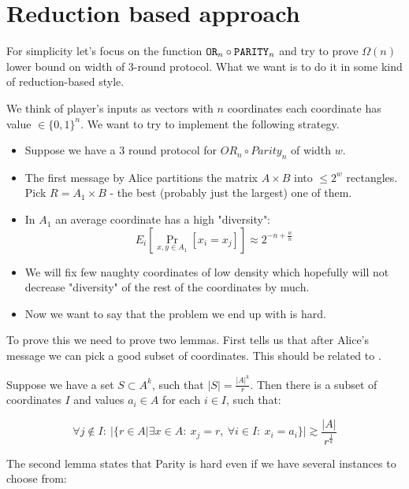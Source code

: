 \section{Reduction based approach}

For simplicity let's focus on the function $\mathtt{OR}_n \circ \mathtt{PARITY}_n$ and try to prove $\Omega(n)$ lower bound
on width of $3$-round protocol. What we want is to do it in some kind of reduction-based style. 

We think of player's inputs as vectors with $n$ coordinates each coordinate has value $\in \{0,
1\}^n$. We want to try to implement the following strategy.

\begin{itemize}
    \item Suppose we have a $3$ round protocol for $OR_n \circ Parity_n$ of width $w$.
    \item The first message by Alice partitions the matrix $A \times B$ into $\leq 2^w$ rectangles. Pick
        $R = A_1 \times B$ - the best (probably just the largest) one of them.
    \item In $A_1$ an average coordinate has a high "diversity":
        \[ E_i [\Pr\limits_{x, y \in A_1}[x_i = x_j]] \approx 2^{-n + \frac{w}{n}} \]
    \item We will fix few naughty coordinates of low density which hopefully will not decrease
        "diversity" of the rest of the coordinates by much.
    \item Now we want to say that the problem we end up with is hard.
\end{itemize}

To prove this we need to prove two lemmas. First tells us that after Alice's message we can pick a good
subset of coordinates. This should be related to \cite{meir2017prediction}.


\begin{lemma}
    Suppose we have a set $S \subset A^k$, such that $|S| = \frac{|A|^k}{r}$. Then there is a subset of
    coordinates $I$ and values $a_i \in A$ for each $i \in I$, such that:
    
    \[ \forall j \not\in I:~  |\{r \in A| \exists x \in A:~  x_j = r, ~ \forall i \in I: ~ x_i = a_i\}|
        \gtrsim \frac{|A|}{r^{\frac{1}{k}}}  \]
    
\end{lemma}


The second lemma states that Parity is hard even if we have several instances to choose from:

